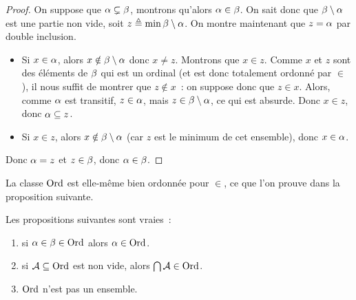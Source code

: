 \begin{proof}
  On suppose que $\alpha \subsetneq \beta$, montrons qu'alors
  $\alpha \in \beta$. On sait donc que $\beta\setminus\alpha$ est une partie
  non vide, soit $z \triangleq \min \beta\setminus\alpha$. On montre maintenant que
  $z = \alpha$ par double inclusion.
  \begin{itemize}
  \item Si $x\in \alpha$, alors $x\notin\beta\setminus\alpha$ donc $x\neq z$.
    Montrons que $x\in z$. Comme $x$ et $z$ sont des éléments de $\beta$ qui
    est un ordinal (et est donc totalement ordonné par $\in$), il nous
    suffit de montrer que $z\notin x$~: on suppose donc que $z \in x$.
    Alors, comme $\alpha$ est transitif, $z\in \alpha$, mais
    $z\in\beta\setminus\alpha$, ce qui est absurde. Donc $x\in z$, donc
    $\alpha\subseteq z$.
  \item Si $x\in z$, alors $x\notin\beta\setminus\alpha$ (car $z$ est le
    minimum de cet ensemble), donc $x\in\alpha$.
  \end{itemize}

  \noindent
  Donc $\alpha = z$ et $z\in \beta$, donc $\alpha \in \beta$.
\end{proof}

\noindent
La classe $\operatorname{Ord}$ est elle-même bien ordonnée pour $\in$, ce que l'on prouve dans
la proposition suivante.

\begin{proposition}
  Les propositions suivantes sont vraies~:
  \begin{enumerate}
  \item si $\alpha\in\beta\in \operatorname{Ord}$ alors $\alpha \in \operatorname{Ord}$.
  \item si $\mathcal A\subseteq \operatorname{Ord}$ est non vide, alors
    $\bigcap \mathcal A \in \operatorname{Ord}$.
  \item $\operatorname{Ord}$ n'est pas un ensemble.
  \end{enumerate}
\end{proposition}

